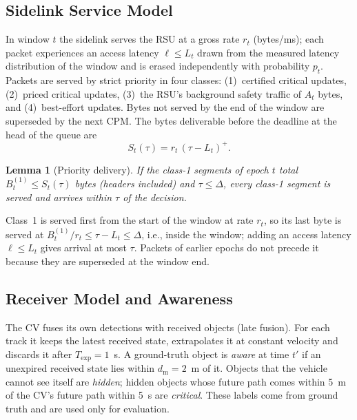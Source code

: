 \documentclass[journal]{IEEEtran}
\newtheorem{lemma}{Lemma}
\theoremstyle{remark}
\begin{document}
\subsection{Sidelink Service Model}\label{sec:service}
In window $t$ the sidelink serves the RSU at a gross rate $r_t$ (bytes/ms); each packet experiences an access latency $\ell\le L_t$ drawn from the measured latency distribution of the window and is erased independently with probability $p_t$. Packets are served by strict priority in four classes: (1)~certified critical updates, (2)~priced critical updates, (3)~the RSU's background safety traffic of $A_t$ bytes, and (4)~best-effort updates. Bytes not served by the end of the window are superseded by the next CPM. The bytes deliverable before the deadline at the head of the queue are
\begin{equation}
S_t(\tau)=r_t\,(\tau-L_t)^+ . \label{eq:S}
\end{equation}
\begin{lemma}[Priority delivery]\label{lem:priority}
If the class-1 segments of epoch $t$ total $B^{(1)}_t\le S_t(\tau)$ bytes (headers included) and $\tau\le\Delta$, every class-1 segment is served and arrives within $\tau$ of the decision.
\end{lemma}
\begin{IEEEproof}
Class~1 is served first from the start of the window at rate $r_t$, so its last byte is served at $B^{(1)}_t/r_t\le\tau-L_t\le\Delta$, i.e., inside the window; adding an access latency $\ell\le L_t$ gives arrival at most $\tau$. Packets of earlier epochs do not precede it because they are superseded at the window end.
\end{IEEEproof}

\subsection{Receiver Model and Awareness}
The CV fuses its own detections with received objects (late fusion). For each track it keeps the latest received state, extrapolates it at constant velocity and discards it after $T_{\exp}=1$~s. A ground-truth object is \emph{aware} at time $t'$ if an unexpired received state lies within $d_{\mathrm{m}}=2$~m of it. Objects that the vehicle cannot see itself are \emph{hidden}; hidden objects whose future path comes within 5~m of the CV's future path within 5~s are \emph{critical}. These labels come from ground truth and are used only for evaluation.
\end{document}
